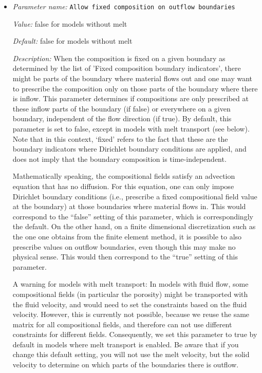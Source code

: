 \begin{itemize}
\item {\it Parameter name:} {\tt Allow fixed composition on outflow boundaries}
\label{parameters:Boundary composition model/Allow fixed composition on outflow boundaries}


{\it Value:} false for models without melt


{\it Default:} false for models without melt


{\it Description:} When the composition is fixed on a given boundary as determined by the list of 'Fixed composition boundary indicators', there might be parts of the boundary where material flows out and one may want to prescribe the composition only on those parts of the boundary where there is inflow. This parameter determines if compositions are only prescribed at these inflow parts of the boundary (if false) or everywhere on a given boundary, independent of the flow direction (if true). By default, this parameter is set to false, except in models with melt transport (see below). Note that in this context, `fixed' refers to the fact that these are the boundary indicators where Dirichlet boundary conditions are applied, and does not imply that the boundary composition is time-independent. 

Mathematically speaking, the compositional fields satisfy an advection equation that has no diffusion. For this equation, one can only impose Dirichlet boundary conditions (i.e., prescribe a fixed compositional field value at the boundary) at those boundaries where material flows in. This would correspond to the ``false'' setting of this parameter, which is correspondingly the default. On the other hand, on a finite dimensional discretization such as the one one obtains from the finite element method, it is possible to also prescribe values on outflow boundaries, even though this may make no physical sense. This would then correspond to the ``true'' setting of this parameter.

A warning for models with melt transport: In models with fluid flow, some compositional fields (in particular the porosity) might be transported with the fluid velocity, and would need to set the constraints based on the fluid velocity. However, this is currently not possible, because we reuse the same matrix for all compositional fields, and therefore can not use different constraints for different fields. Consequently, we set this parameter to true by default in models where melt transport is enabled. Be aware that if you change this default setting, you will not use the melt velocity, but the solid velocity to determine on which parts of the boundaries there is outflow.



\end{itemize}
